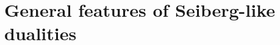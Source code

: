 
\section{General features of Seiberg-like dualities}

\begin{comment}
~ "Classically, and to all orders of perturbation theory, the electric and magnetic
   theories have different moduli spaces of vacua – it is only after taking nonperturbative
   effects into account that they are seen to be identical. For example, in
   the electric theory there is a classical constraint rankhMi ≤ Nc. In the dual theory,
   M is an independent field whose expectation value is unconstrained to all orders of
   perturbation theory – the constraint arises in the dual theory by quantum effects!"
   pag 27 di lectures

\end{comment}

